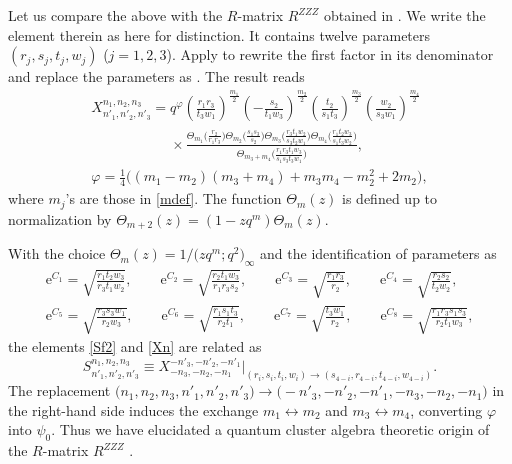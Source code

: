 \documentclass[pdftex]{sigma}
\newcommand{\e}{{\mathrm e}}
\numberwithin{equation}{section}
\begin{document}
Let us compare the above  with
the $R$-matrix $R^{ZZZ}$ obtained in \cite[equation~(45)]{KMY23}. We
write the element  therein as 
here for distinction. It contains twelve parameters~${(r_j ,s_j, t_j, w_j)}$ ($j=1, 2, 3$). Apply \cite[equation~(51)]{KMY23} to rewrite the first factor in its denominator and
replace the parameters as
. The
result reads
\begin{gather}
X^{n_1,n_2,n_3}_{n'_1,n'_2,n'_3}=
q^{\varphi} \left(\frac{r_1r_3}{t_3w_1}\right)^{\frac{m_1}{2}}
\left(-\frac{s_2}{t_1w_3}\right)^{\frac{m_2}{2}}
\left( \frac{t_2}{s_1t_3}\right)^{\frac{m_3}{2}}
\left(\frac{w_2}{s_3w_1}\right)^{\frac{m_4}{2}}\nonumber
\\
\phantom{X^{n_1,n_2,n_3}_{n'_1,n'_2,n'_3}=}{}\times
\frac{
\Theta_{m_1}\bigl(\frac{r_2}{r_1r_3}\bigr)
\Theta_{m_2}\bigl(\frac{s_1s_3}{s_2}\bigr)
\Theta_{m_3}\bigl(\frac{r_3t_1w_2}{s_3t_2w_1}\bigr)
\Theta_{m_4}\bigl(\frac{r_1t_2w_3}{s_1t_3w_2}\bigr)}
{\Theta_{m_3+m_4}\bigl(\frac{r_1r_3t_1w_3}{s_1s_3t_3w_1}\bigr)},\nonumber
\\
\varphi = \frac{1}{4}\bigl((m_1-m_2)(m_3+m_4)+m_3m_4-m^2_2+2m_2\bigr),\label{Xn}
\end{gather}
where $m_j$'s are those in \eqref{mdef}.
The function $\Theta_m(z)$ is defined up to normalization by
$\Theta_{m+2}(z) = (1-zq^m)\Theta_m(z)$.

\begin{Remark}\label{re:kmy0}
With the choice $\Theta_m(z)=1/\bigl(zq^m;q^2\bigr)_\infty$ and the identification of parameters as
\begin{gather}
\e^{C_1} = \sqrt{\frac{r_1 t_2 w_3}{r_3 t_1 w_2}}, \qquad
\e^{C_2} = \sqrt{\frac{r_2 t_1 w_3}{r_1 r_3 s_2}}, \qquad
\e^{C_3} = \sqrt{\frac{r_1 r_3}{r_2}}, \qquad
\e^{C_4} = \sqrt{\frac{r_2 s_2}{t_2 w_2}},\nonumber
\\
\e^{C_5} = \sqrt{\frac{r_3 s_3 w_1}{r_2 w_3}}, \qquad
\e^{C_6} = \sqrt{\frac{r_1 s_1 t_3}{r_2 t_1}}, \qquad
\e^{C_7} = \sqrt{\frac{t_3 w_1}{r_2}}, \qquad
\e^{C_8} = \sqrt{\frac{r_1 r_3 s_1 s_3}{r_2 t_1 w_3}},\label{Css}
\end{gather}
the elements \eqref{Sf2} and \eqref{Xn} are related as
\[
S^{n_1,n_2, n_3}_{n'_1, n'_2, n'_3} \equiv
X^{-n'_3,-n'_2,-n'_1}_{-n_3,-n_2, -n_1}\big|_{(r_i,s_i,t_i,w_i) \rightarrow
(s_{4-i},r_{4-i}, t_{4-i}, w_{4-i})} .
\]
The replacement $\bigl(n_1,n_2,n_3,n'_1,n'_2,n'_3\bigr) \rightarrow
\bigl(-n'_3,-n'_2,-n'_1,-n_3,-n_2,-n_1\bigr)$ in the right-hand side induces
the exchange $m_1 \leftrightarrow m_2$ and $m_3 \leftrightarrow m_4$,
converting $\varphi$ into $\psi_0$.
Thus we have elucidated a quantum cluster algebra theoretic origin of
the $R$-matrix $R^{ZZZ}$ \cite{KMY23}.
\end{Remark}
\end{document}
